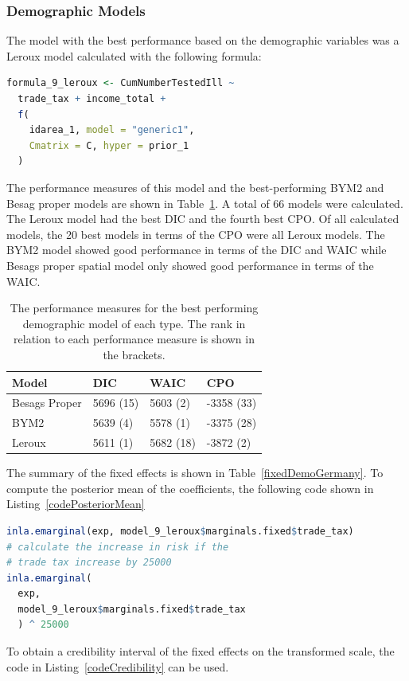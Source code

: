 \subsubsection{Demographic Models}
The model with the best performance based on the demographic variables was a Leroux model calculated with the following formula:
\begin{lstlisting}[caption={The formula for the best Leroux model based on the demographic variables}, label={codeDemoGermany}, language=R]
formula_9_leroux <- CumNumberTestedIll ~
  trade_tax + income_total +
  f(
    idarea_1, model = "generic1",
    Cmatrix = C, hyper = prior_1
  )
\end{lstlisting}
The performance measures of this model and the best-performing BYM2 and Besag proper models are shown in Table~\ref{demoGermany}. A total of 66 models were calculated. The Leroux model had the best DIC and the fourth best CPO. Of all calculated models, the 20 best models in terms of the CPO were all Leroux models. The BYM2 model showed good performance in terms of the DIC and WAIC while Besags proper spatial model only showed good performance in terms of the WAIC.
\begin{table}[H] 
\caption{The performance measures for the best performing demographic model of each type. The rank in relation to each performance measure is shown in the brackets. \label{demoGermany}}
\begin{tabular}{l l l l}
\toprule
\textbf{Model}	& \textbf{DIC}	& \textbf{WAIC} & \textbf{CPO} \\
\midrule
Besags Proper  & 5696 (15) & 5603 (2) & -3358 (33) \\
BYM2 & 5639 (4) & 5578 (1) & -3375 (28)\\
Leroux & 5611 (1) & 5682 (18) & -3872 (2) \\
\bottomrule
\end{tabular}
\end{table}
The summary of the fixed effects is shown in Table~\ref{fixedDemoGermany}. To compute the posterior mean of the coefficients, the following code shown in Listing~\ref{codePosteriorMean}
\begin{lstlisting}[caption={Calculating the posterior mean of a coefficent.}, label={codePosteriorMean}, language=R]
inla.emarginal(exp, model_9_leroux$marginals.fixed$trade_tax)
# calculate the increase in risk if the 
# trade tax increase by 25000
inla.emarginal(
  exp,
  model_9_leroux$marginals.fixed$trade_tax
  ) ^ 25000
\end{lstlisting}
To obtain a credibility interval of the fixed effects on the transformed scale, the code in Listing~\ref{codeCredibility} can be used.
